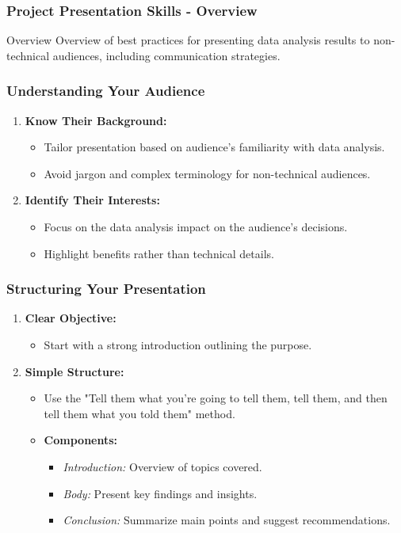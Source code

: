\documentclass[aspectratio=169]{beamer}
\begin{document}
\begin{frame}[fragile]
    \frametitle{Project Presentation Skills - Overview}
    \begin{block}{Overview}
        Overview of best practices for presenting data analysis results to non-technical audiences, including communication strategies.
    \end{block}
\end{frame}

\begin{frame}[fragile]
    \frametitle{Understanding Your Audience}
    \begin{enumerate}
        \item \textbf{Know Their Background:}
        \begin{itemize}
            \item Tailor presentation based on audience's familiarity with data analysis.
            \item Avoid jargon and complex terminology for non-technical audiences.
        \end{itemize}
        
        \item \textbf{Identify Their Interests:}
        \begin{itemize}
            \item Focus on the data analysis impact on the audience's decisions.
            \item Highlight benefits rather than technical details.
        \end{itemize}
    \end{enumerate}
\end{frame}

\begin{frame}[fragile]
    \frametitle{Structuring Your Presentation}
    \begin{enumerate}
        \item \textbf{Clear Objective:} 
        \begin{itemize}
            \item Start with a strong introduction outlining the purpose.
        \end{itemize}

        \item \textbf{Simple Structure:} 
        \begin{itemize}
            \item Use the "Tell them what you’re going to tell them, tell them, and then tell them what you told them" method.
            \item \textbf{Components:}
            \begin{itemize}
                \item \textit{Introduction:} Overview of topics covered.
                \item \textit{Body:} Present key findings and insights.
                \item \textit{Conclusion:} Summarize main points and suggest recommendations.
            \end{itemize}
        \end{itemize}
    \end{enumerate}
\end{frame}
\end{document}
